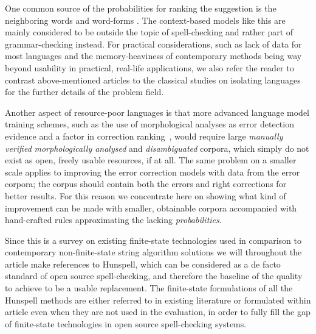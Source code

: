 \documentclass[a4paper,12pt]{article}
\begin{document}
One common source of the probabilities for ranking the suggestion is the
neighboring words and word-forms \cite[]{pirinen2012improving,otero/2007}.  The
context-based models like this are mainly considered to be outside the topic of
spell-checking and rather part of grammar-checking instead. For practical
considerations, such as lack of data for most languages and the
memory-heaviness of contemporary methods being way beyond usability in
practical, real-life applications, we also refer the reader to contrast
above-mentioned articles to the classical studies on isolating
languages~\cite[]{mays/1991,wilcoxohearn2008realword} for the further details
of the problem field.

Another aspect of resource-poor languages is that more advanced language model
training schemes, such as the use of morphological analyses as error detection
evidence \cite[]{mays/1991} and a factor in correction
ranking~\cite[]{otero/2007}, would require large \emph{manually verified}
\emph{morphologically analysed} and \emph{disambiguated} corpora, which simply
do not exist as open, freely usable resources, if at all. The same problem on a
smaller scale applies to improving the error correction models with data from
the error corpora; the corpus should contain both the errors and right
corrections for better results. For this reason we concentrate here on showing
what kind of improvement can be made with smaller, obtainable corpora
accompanied with hand-crafted rules approximating the lacking
\emph{probabilities}.

Since this is a survey on existing finite-state technologies used in comparison
to contemporary non-finite-state string algorithm solutions we will throughout
the article make references to Hunspell, which can be considered as a de facto
standard of open source spell-checking, and therefore the baseline of the
quality to achieve to be a usable replacement. The finite-state formulations of
all the Hunspell methods are either referred to in existing literature or
formulated within article even when they are not used in the evaluation, in
order to fully fill the gap of finite-state technologies in open source
spell-checking systems.
\end{document}
